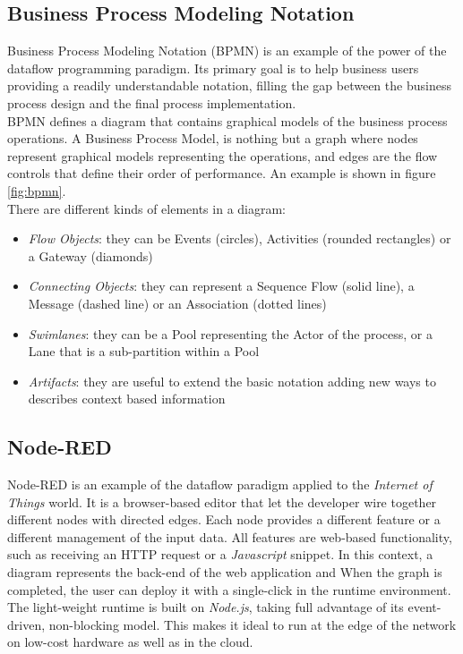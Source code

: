 \subsection{Business Process Modeling Notation}\label{BPMN}

Business Process Modeling Notation (BPMN) is an example of the power of the dataflow programming paradigm. Its primary goal is to help business users providing a readily understandable notation, filling the gap between the business process design and the final process implementation.
\\

BPMN defines a diagram that contains graphical models of the business process operations. A Business Process Model, is nothing but a graph where nodes represent graphical models representing the operations, and edges are the flow controls that define their order of performance. An example is shown in figure \ref{fig:bpmn}.
\\


There are different kinds of elements in a diagram:

\begin{itemize}
\item{\textit{Flow Objects}: they can be Events (circles), Activities (rounded rectangles) or a Gateway (diamonds)}
\item{\textit{Connecting Objects}: they can represent a Sequence Flow (solid line), a Message (dashed line) or an Association (dotted lines)}
\item{\textit{Swimlanes}: they can be a Pool representing the Actor of the process, or a Lane that is a sub-partition within a Pool}
\item{\textit{Artifacts}: they are useful to extend the basic notation adding new ways to describes context based information}
\end{itemize}

\subsection{Node-RED}\label{NodeRed}

Node-RED is an example of the dataflow paradigm applied to the \textit{Internet of Things} world.
It is a browser-based editor that let the developer wire together different nodes with directed edges.
Each node provides a different feature or a different management of the input data.
All features are web-based functionality, such as receiving an HTTP request or a \textit{Javascript} snippet.
In this context, a diagram represents the back-end of the web application and When the graph is completed, the user can deploy it with a single-click in the runtime environment.
The light-weight runtime is built on \textit{Node.js}, taking full advantage of its event-driven, non-blocking model. This makes it ideal to run at the edge of the network on low-cost hardware as well as in the cloud.
\\

